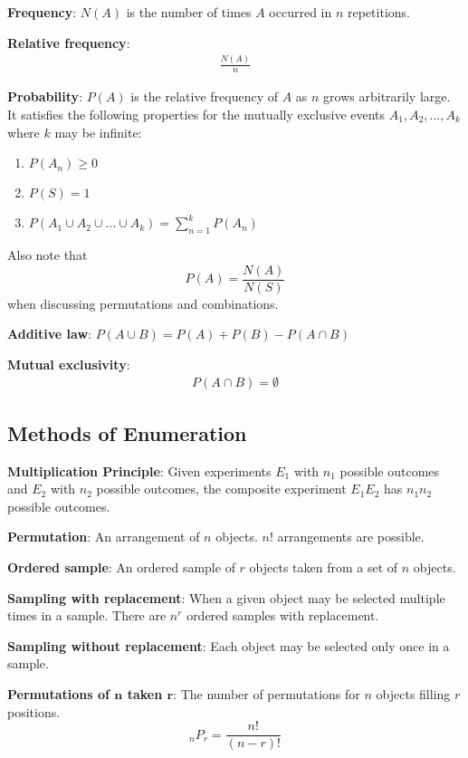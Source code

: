 \documentclass{article}
\begin{document}
\begin{multicols*}{2}
\textbf{Frequency}: $N(A)$ is the number of times $A$ occurred in $n$ repetitions.

\textbf{Relative frequency}:
\begin{align*}
    \frac{N(A)}{n}
\end{align*}

\textbf{Probability}: $P(A)$ is the relative frequency of $A$ as $n$ grows arbitrarily large. It satisfies the following properties for the mutually exclusive events $A_1, A_2, \ldots, A_k$ where $k$ may be infinite:
\begin{enumerate}
    \item $P(A_n) \geq 0$
    \item $P(S) = 1$
    \item $P(A_1 \cup A_2 \cup \ldots \cup A_k) = \sum_{n=1}^k{P(A_n)}$
\end{enumerate}

Also note that
\[P(A) = \frac{N(A)}{N(S)}\]
when discussing permutations and combinations.

\textbf{Additive law}: $P(A \cup B) = P(A) + P(B) - P(A \cap B)$

\textbf{Mutual exclusivity}:
\begin{align*}
    P(A \cap B) = \emptyset
\end{align*}

\subsection{Methods of Enumeration}

\textbf{Multiplication Principle}: Given experiments $E_1$ with $n_1$ possible outcomes and $E_2$ with $n_2$ possible outcomes, the composite experiment $E_1 E_2$ has $n_1 n_2$ possible outcomes.

\textbf{Permutation}: An arrangement of $n$ objects. $n!$ arrangements are possible.

\textbf{Ordered sample}: An ordered sample of $r$ objects taken from a set of $n$ objects.

\textbf{Sampling with replacement}: When a given object may be selected multiple times in a sample. There are $n^r$ ordered samples with replacement.

\textbf{Sampling without replacement}: Each object may be selected only once in a sample.

\textbf{Permutations of $\mathbf{n}$ taken $\mathbf{r}$}:
The number of permutations for $n$ objects filling $r$ positions.
\[{}_n P_r = \frac{n!}{(n-r)!}\]


\end{multicols*}
\end{document}

